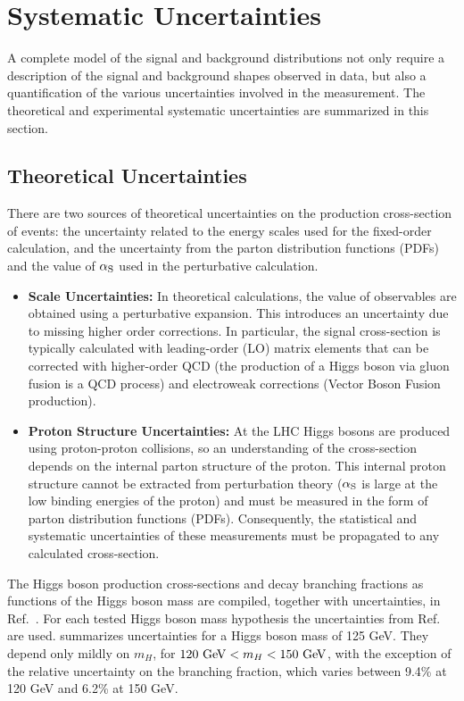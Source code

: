 \section{Systematic Uncertainties}
\label{sec:sys}
A complete model of the signal and background distributions not only require
a description of the signal and background shapes observed in data, but also 
a quantification of the various uncertainties involved in the measurement.
The theoretical and experimental systematic uncertainties are summarized in
this section.

\subsection{Theoretical Uncertainties}
There are two sources of theoretical uncertainties on the production cross-section
of \HToZg events: the uncertainty related to the energy scales used for the
fixed-order calculation, and the uncertainty from the parton distribution functions
(PDFs) and the value of $\alpha_{\mathrm{S}}$ used in the perturbative calculation. 

\begin{itemize}
\item \textbf{Scale Uncertainties:} 
In theoretical calculations, the value of observables are obtained using a 
perturbative expansion. This introduces an uncertainty due to missing higher order
corrections. In particular, the \HToZg signal cross-section is typically calculated
with leading-order (LO) matrix elements that can be corrected with higher-order
QCD (the production of a Higgs boson via gluon fusion is a QCD process) and 
electroweak corrections (Vector Boson Fusion production).

\item \textbf{Proton Structure Uncertainties:}
At the LHC Higgs bosons are produced using proton-proton collisions, so
an understanding of the \HToZg cross-section depends on the internal
parton structure of the proton. This internal proton structure cannot be
extracted from perturbation theory ($\alpha_{\mathrm{S}}$ is large at the low binding
energies of the proton) and must be measured in the form of parton distribution
functions (PDFs). Consequently, the statistical and systematic uncertainties 
of these measurements must be propagated to any calculated cross-section.
\end{itemize}

The Higgs boson production
cross-sections and decay branching fractions as functions of the Higgs boson
mass are compiled, together with uncertainties, in Ref.~\cite{LHCHiggsCrossSectionWorkingGroup:2011ti}.
For each tested Higgs boson mass hypothesis the uncertainties from Ref.~\cite{LHCHiggsCrossSectionWorkingGroup:2011ti} are used.
 summarizes uncertainties for a Higgs boson mass of
125 GeV. They depend only mildly on $m_H$, for $120 \GeV < m_H < 150 \GeV$,
with the exception of the relative uncertainty on the \HToZg branching fraction,
which varies between 9.4\% at 120 GeV and 6.2\% at 150 GeV.

